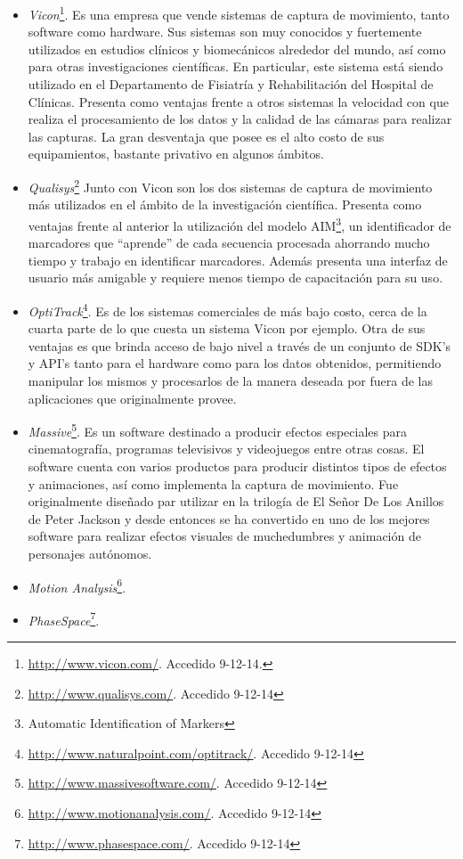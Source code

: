 \begin{itemize}
\item \emph{Vicon}\footnote{ \textcolor{blue}{\underline{\url{http://www.vicon.com/}}}. Accedido 9-12-14. }. Es una empresa que vende sistemas de captura de movimiento, tanto software como hardware. Sus sistemas son muy conocidos y fuertemente utilizados en estudios clínicos y biomecánicos alrededor del mundo, así como para otras investigaciones científicas. En particular, este sistema está siendo utilizado en el Departamento de Fisiatría y Rehabilitación del Hospital de Clínicas. Presenta como ventajas frente a otros sistemas la velocidad con que realiza el procesamiento de los datos y la calidad de las cámaras para realizar las capturas. La gran desventaja que posee es el alto costo de sus equipamientos, bastante privativo en algunos ámbitos.
\item \emph{Qualisys}\footnote{ \textcolor{blue}{\underline{\url{http://www.qualisys.com/}}}. Accedido 9-12-14} Junto con Vicon son los dos sistemas de captura de movimiento más utilizados en el ámbito de la investigación científica. Presenta como ventajas frente al anterior la utilización del modelo AIM\footnote{Automatic Identification of Markers}, un identificador de marcadores que ``aprende'' de cada secuencia procesada ahorrando mucho tiempo y trabajo en identificar marcadores. Además presenta una interfaz de usuario más amigable y requiere menos tiempo de capacitación para su uso.
\item \emph{OptiTrack}\footnote{ \textcolor{blue}{\underline{\url{http://www.naturalpoint.com/optitrack/}}}. Accedido 9-12-14}. Es de los sistemas comerciales de más bajo costo, cerca de la cuarta parte de lo que cuesta un sistema Vicon por ejemplo. Otra de sus ventajas es que brinda acceso de bajo nivel a través de un conjunto de  SDK's y API's tanto para el hardware como para los datos obtenidos, permitiendo manipular los mismos y procesarlos de la manera deseada por fuera de las aplicaciones que originalmente provee. 
\item \emph{Massive}\footnote{ \textcolor{blue}{\underline{\url{http://www.massivesoftware.com/}}}. Accedido 9-12-14}. Es un software destinado a producir efectos especiales para cinematografía, programas televisivos y videojuegos entre otras cosas. El software cuenta con varios productos para producir distintos tipos de efectos y animaciones, así como implementa la captura de movimiento. Fue originalmente diseñado par utilizar en la trilogía de El Señor De Los Anillos de Peter Jackson y desde entonces se ha convertido en uno de los mejores software para realizar efectos visuales de muchedumbres y animación de personajes autónomos.
\item \emph{Motion Analysis}\footnote{ \textcolor{blue}{\underline{\url{http://www.motionanalysis.com/}}}. Accedido 9-12-14}.
\item \emph{PhaseSpace}\footnote{ \textcolor{blue}{\underline{\url{http://www.phasespace.com/}}}. Accedido 9-12-14}.
\end{itemize}

